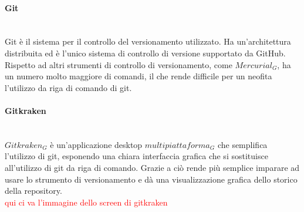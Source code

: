 		\paragraph{Git} \mbox{} \\
		Git\label{descGit} è il sistema per il controllo del versionamento utilizzato. Ha un'architettura distribuita ed è l'unico sistema di controllo di versione supportato da GitHub. Rispetto ad altri strumenti di controllo di versionamento, come $Mercurial_G$, ha un numero molto maggiore di comandi, il che rende difficile per un neofita l'utilizzo da riga di comando di git.
		
		\paragraph{Gitkraken} \mbox{} \\
		$Gitkraken_G$ è un'applicazione desktop $multipiattaforma_G$ che semplifica l'utilizzo di git, esponendo una chiara interfaccia grafica che si sostituisce all'utilizzo di git da riga di comando. Grazie a ciò rende più semplice imparare ad usare lo strumento di versionamento e dà una visualizzazione grafica dello storico della repository.
		\\ \textcolor{red}{qui ci va l'immagine dello screen di gitkraken}
